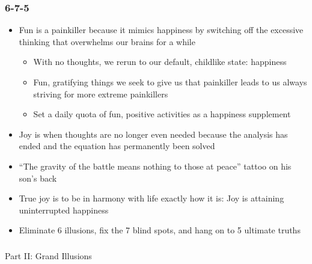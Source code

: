 \begin{frame}[fragile]\frametitle{6-7-5}

\begin{itemize}
\item Fun is a painkiller because it mimics happiness by switching off the excessive thinking that overwhelms our brains for a while
	\begin{itemize}
	\item With no thoughts, we rerun to our default, childlike state: happiness
	\item Fun, gratifying things we seek to give us that painkiller leads to us always striving for more extreme painkillers
	\item Set a daily quota of fun, positive activities as a happiness supplement
	\end{itemize}
\item Joy is when thoughts are no longer even needed because the analysis has ended and the equation has permanently been solved
 \item “The gravity of the battle means nothing to those at peace” tattoo on his son’s back
\item True joy is to be in harmony with life exactly how it is: Joy is attaining uninterrupted happiness
\item Eliminate 6 illusions, fix the 7 blind spots, and hang on to 5 ultimate truths
\end{itemize}
\end{frame}

\begin{frame}[fragile]\frametitle{}
\begin{center}
{\Large Part II: Grand Illusions}
\end{center}
\end{frame}


